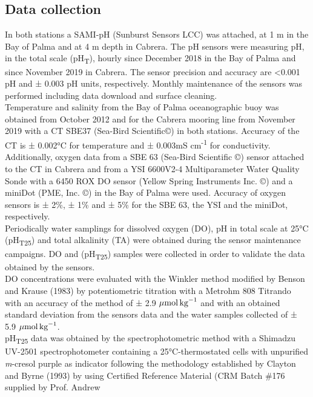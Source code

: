 \subsection{Data collection}
In both stations a SAMI-pH (Sunburst Sensors LCC) was attached, at 1 m in
the Bay of Palma and at 4 m depth in Cabrera. The pH sensors were measuring pH,
in the total scale (pH\textsubscript{T}), hourly since December 2018 in the Bay
of Palma and since November 2019 in Cabrera. The sensor precision and accuracy
are <0.001 pH and ± 0.003 pH units, respectively. Monthly maintenance of the
sensors was performed including data download and surface cleaning.\\
Temperature and salinity from the Bay of Palma oceanographic buoy was
obtained from October 2012 and for the Cabrera mooring line from November 2019
with a CT SBE37 (Sea-Bird Scientific©) in both stations. Accuracy of the CT is
± 0.002°C for temperature and ± 0.003mS cm\textsuperscript{-1} for
conductivity.  Additionally, oxygen data from a SBE 63 (Sea-Bird Scientific ©)
sensor attached to the CT in Cabrera and from a YSI 6600V2-4 Multiparameter
Water Quality Sonde with a 6450 ROX DO sensor (Yellow Spring Instruments Inc.
©)\cite{tintore2022} and a miniDot (PME, Inc. ©) in the Bay of Palma were used.
Accuracy of oxygen sensors is ± 2\%, ± 1\% and ± 5\% for the SBE 63, the YSI
and the miniDot, respectively.\\
Periodically water samplings for dissolved oxygen (DO), pH in total scale
at 25°C (pH\textsubscript{T25}) and total alkalinity (TA) were obtained during
the sensor maintenance campaigns. DO and (pH\textsubscript{T25}) samples were
collected in order to validate the data obtained by the sensors.\\
DO concentrations were evaluated with the Winkler method modified by Benson
and Krause (1983) \cite{Benson_Krause_1984} by potentiometric titration with a
Metrohm 808 Titrando with an accuracy of the method of ± 2.9 ${\mu
            \textrm{mol\,kg}^{-1}}$ and with an obtained standard deviation
from the
sensors data and the water samples collected of ± 5.9 ${\mu
            \textrm{mol\,kg}^{-1}}$.\\
pH\textsubscript{T25} data was obtained by the spectrophotometric method
with a Shimadzu UV-2501 spectrophotometer containing a 25°C-thermostated cells
with unpurified \emph{m}-cresol purple as indicator following the methodology
established by Clayton and Byrne (1993)\cite{Clayton_Byrne_1993} by using
Certified Reference  Material (CRM Batch \#176 supplied by Prof.  Andrew
